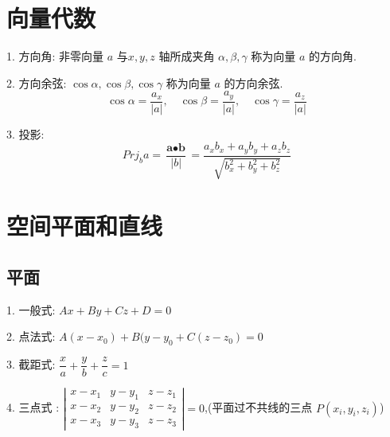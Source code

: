 \section{向量代数}
\begin{definition}
	1. 方向角: 非零向量 $a$ 与$x,y,z$ 轴所成夹角 $\alpha,\beta,\gamma$ 称为向量 $a$ 的方向角. 
	
	2. 方向余弦: $\cos \alpha,\cos \beta,\cos\gamma$ 称为向量 $a$ 的方向余弦.
	$$\cos \alpha=\frac{a_{x}}{|a|},\quad \cos \beta=\frac{a_{y}}{|a|},\quad \cos \gamma=\frac{a_{z}}{|a|}$$
	
	3. 投影: 
	$$Prj_{b}a=\frac{\textbf{a}\bullet\textbf{b}}{|b|}=\frac{a_{x}b_{x}+a_{y}b_{y}+a_{z}b_{z}}{\sqrt{b_{x}^2+b_{y}^2+b_{z}^2}}$$
\end{definition}
\section{空间平面和直线}
\subsection{平面}
\begin{definition}[	平面方程]
	
	1. 一般式:  $Ax+By+Cz+D=0$
	
	2. 点法式:  $A(x-x_{0})+B(y-y_{0}+C(z-z_{0})=0$
	
	3. 截距式:  $\dfrac{x}{a}+\dfrac{y}{b}+\dfrac{z}{c}=1$
	
	4. 三点式 : $\left|\begin{array}{lll}
		x-x_{1}&y-y_{1}&z-z_{1}\\
		x-x_{2}&y-y_{2}&z-z_{2}\\
		x-x_{3}&y-y_{3}&z-z_{3}
	\end{array}\right|=0$,(平面过不共线的三点 $P(x_{i},y_{i},z_{i})$)
\end{definition}
